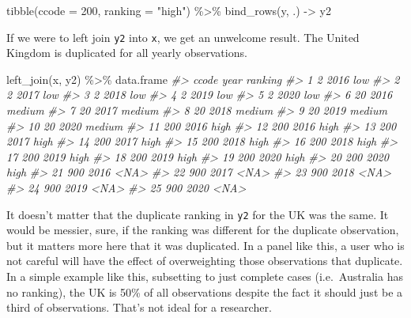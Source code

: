 \documentclass[
  11pt,
]{article}
\newenvironment{Shaded}{\begin{snugshade}}{\end{snugshade}}
\newcommand{\AttributeTok}[1]{\textcolor[rgb]{0.77,0.63,0.00}{#1}}
\newcommand{\CommentTok}[1]{\textcolor[rgb]{0.56,0.35,0.01}{\textit{#1}}}
\newcommand{\DecValTok}[1]{\textcolor[rgb]{0.00,0.00,0.81}{#1}}
\newcommand{\FunctionTok}[1]{\textcolor[rgb]{0.00,0.00,0.00}{#1}}
\newcommand{\NormalTok}[1]{#1}
\newcommand{\OtherTok}[1]{\textcolor[rgb]{0.56,0.35,0.01}{#1}}
\newcommand{\SpecialCharTok}[1]{\textcolor[rgb]{0.00,0.00,0.00}{#1}}
\newcommand{\StringTok}[1]{\textcolor[rgb]{0.31,0.60,0.02}{#1}}
\begin{document}
\begin{Shaded}
\begin{Highlighting}[]
\FunctionTok{tibble}\NormalTok{(}\AttributeTok{ccode =} \DecValTok{200}\NormalTok{,}
       \AttributeTok{ranking =} \StringTok{"high"}\NormalTok{) }\SpecialCharTok{\%\textgreater{}\%}
  \FunctionTok{bind\_rows}\NormalTok{(y, .) }\OtherTok{{-}\textgreater{}}\NormalTok{ y2}
\end{Highlighting}
\end{Shaded}

If we were to left join \texttt{y2} into \texttt{x}, we get an unwelcome result. The United Kingdom is duplicated for all yearly observations.

\begin{Shaded}
\begin{Highlighting}[]
\FunctionTok{left\_join}\NormalTok{(x, y2) }\SpecialCharTok{\%\textgreater{}\%}\NormalTok{ data.frame}
\CommentTok{\#\textgreater{}    ccode year ranking}
\CommentTok{\#\textgreater{} 1      2 2016     low}
\CommentTok{\#\textgreater{} 2      2 2017     low}
\CommentTok{\#\textgreater{} 3      2 2018     low}
\CommentTok{\#\textgreater{} 4      2 2019     low}
\CommentTok{\#\textgreater{} 5      2 2020     low}
\CommentTok{\#\textgreater{} 6     20 2016  medium}
\CommentTok{\#\textgreater{} 7     20 2017  medium}
\CommentTok{\#\textgreater{} 8     20 2018  medium}
\CommentTok{\#\textgreater{} 9     20 2019  medium}
\CommentTok{\#\textgreater{} 10    20 2020  medium}
\CommentTok{\#\textgreater{} 11   200 2016    high}
\CommentTok{\#\textgreater{} 12   200 2016    high}
\CommentTok{\#\textgreater{} 13   200 2017    high}
\CommentTok{\#\textgreater{} 14   200 2017    high}
\CommentTok{\#\textgreater{} 15   200 2018    high}
\CommentTok{\#\textgreater{} 16   200 2018    high}
\CommentTok{\#\textgreater{} 17   200 2019    high}
\CommentTok{\#\textgreater{} 18   200 2019    high}
\CommentTok{\#\textgreater{} 19   200 2020    high}
\CommentTok{\#\textgreater{} 20   200 2020    high}
\CommentTok{\#\textgreater{} 21   900 2016    \textless{}NA\textgreater{}}
\CommentTok{\#\textgreater{} 22   900 2017    \textless{}NA\textgreater{}}
\CommentTok{\#\textgreater{} 23   900 2018    \textless{}NA\textgreater{}}
\CommentTok{\#\textgreater{} 24   900 2019    \textless{}NA\textgreater{}}
\CommentTok{\#\textgreater{} 25   900 2020    \textless{}NA\textgreater{}}
\end{Highlighting}
\end{Shaded}

It doesn't matter that the duplicate ranking in \texttt{y2} for the UK was the same. It would be messier, sure, if the ranking was different for the duplicate observation, but it matters more here that it was duplicated. In a panel like this, a user who is not careful will have the effect of overweighting those observations that duplicate. In a simple example like this, subsetting to just complete cases (i.e.~Australia has no ranking), the UK is 50\% of all observations despite the fact it should just be a third of observations. That's not ideal for a researcher.
\end{document}
